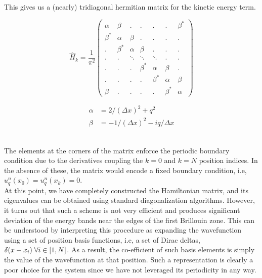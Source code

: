 This gives us a (nearly) tridiagonal hermitian matrix for the kinetic energy term. 
\vspace{0.5cm}\\
\begin{minipage}{0.6\linewidth}
$$
\hat{H}_k =\frac{1}{\pi^2} \begin{pmatrix}
    \alpha &\beta  &.     &.&.&.&\beta^*\\
\beta^* &\alpha &\beta &.&.&.&.\\
    .      &\beta^*&\alpha&\beta&.&.&.\\
.       &.      &\ddots     &\ddots&\ddots&.&.\\
.       &.      &.     &\beta^*&\alpha&\beta&.\\
.       &.      &.     &.&\beta^*&\alpha&\beta\\
\beta      &.      &.     &.&.&\beta^*&\alpha
\end{pmatrix} 
$$ 
\end{minipage}%
\begin{minipage}{0.3\linewidth}
    \begin{align*}
        \alpha &= 2/(\Delta x)^2 + q^2 \\
        \beta &= -1/(\Delta x)^2- iq/\Delta x
    \end{align*} 
\end{minipage}
\vspace{0.5cm}\\
The elements at the corners of the matrix enforce the periodic boundary condition due to the derivatives coupling the $k = 0$ and $k=N$ position indices. In the absence of these, the matrix would encode a fixed boundary condition, i.e, $u_q^n(x_0) = u_q^n(x_k) = 0$. 
\vspace{0.5cm}\\
At this point, we have completely constructed the Hamiltonian matrix, and its eigenvalues can be obtained using standard diagonalization algorithms. However, it turns out that such a scheme is not very efficient and produces significant deviation of the energy bands near the edges of the first Brillouin zone. This can be understood by interpreting this procedure as expanding the wavefunction using a set of position basis functions, i.e, a set of Dirac deltas, $\delta(x - x_i) \hspace{0.1cm}\forall i \in [1, N]$. As a result, the co-efficient of such basis elements is simply the value of the wavefunction at that position. Such a representation is clearly a poor choice for the system since we have not leveraged its periodicity in any way.

